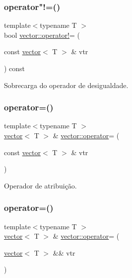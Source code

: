 \subsubsection{\texorpdfstring{operator"!=()}{operator!=()}}
{\footnotesize\ttfamily template$<$typename T $>$ \\
bool \hyperlink{game__classes_8hpp_a5dea3f07ccd43cf7042c728d769e92fc}{vector\+::operator!}= (\begin{DoxyParamCaption}\item[{const \hyperlink{classsc_1_1vector}{vector}$<$ T $>$ \&}]{vtr }\end{DoxyParamCaption}) const}



Sobrecarga do operador de desigualdade. 

\mbox{\label{classsc_1_1vector_aa39c1f22582a429142479349a40cbbb7}} 
\subsubsection{\texorpdfstring{operator=()}{operator=()}\hspace{0.1cm}{\footnotesize\ttfamily [1/2]}}
{\footnotesize\ttfamily template$<$typename T $>$ \\
\hyperlink{classsc_1_1vector}{vector}$<$ T $>$ \& \hyperlink{classsc_1_1vector_a889e37c4415a33fb90d8b564bf428e24}{vector\+::operator}= (\begin{DoxyParamCaption}\item[{const \hyperlink{classsc_1_1vector}{vector}$<$ T $>$ \&}]{vtr }\end{DoxyParamCaption})}



Operador de atribuição. 

\mbox{\label{classsc_1_1vector_a8d6fa43cf97edad41fe82e4c91b3d064}} 
\subsubsection{\texorpdfstring{operator=()}{operator=()}\hspace{0.1cm}{\footnotesize\ttfamily [2/2]}}
{\footnotesize\ttfamily template$<$typename T $>$ \\
\hyperlink{classsc_1_1vector}{vector}$<$ T $>$ \& \hyperlink{classsc_1_1vector_a889e37c4415a33fb90d8b564bf428e24}{vector\+::operator}= (\begin{DoxyParamCaption}\item[{\hyperlink{classsc_1_1vector}{vector}$<$ T $>$ \&\&}]{vtr }\end{DoxyParamCaption})}




